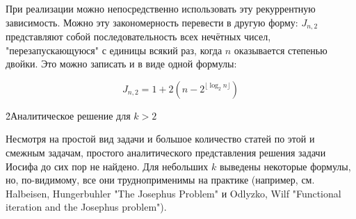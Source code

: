 При реализации можно непосредственно использовать эту рекуррентную зависимость. Можно эту закономерность перевести в другую форму: $J_{n,2}$ представляют собой последовательность всех нечётных чисел, "перезапускающуюся" с единицы всякий раз, когда $n$ оказывается степенью двойки. Это можно записать и в виде одной формулы:

$$ J_{n,2} = 1 + 2 \left( n - 2^{\lfloor \log_2 n \rfloor} \right) $$

\h2{Аналитическое решение для $k>2$}

Несмотря на простой вид задачи и большое количество статей по этой и смежным задачам, простого аналитического представления решения задачи Иосифа до сих пор не найдено. Для небольших $k$ выведены некоторые формулы, но, по-видимому, все они трудноприменимы на практике (например, см. Halbeisen, Hungerbuhler "The Josephus Problem" и Odlyzko, Wilf "Functional iteration and the Josephus problem").